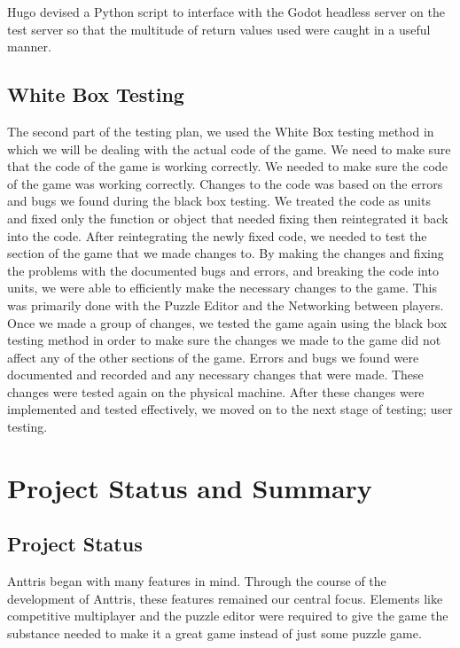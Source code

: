 \documentclass[12pt]{article}
\begin{document}
Hugo devised a Python script to interface with the Godot headless server on the test server so that the multitude of return values used were caught in a useful manner. 

\subsection{White Box Testing}
The second part of the testing plan, we used the White Box testing method in which we will be dealing with the actual code of the game. We need to make sure that the code of the game is working correctly. We needed to make sure the code of the game was working correctly.
Changes to the code was based on the errors and bugs we found during the black box testing. We treated the code as units and fixed only the function or object that needed fixing then reintegrated it back into the code. After reintegrating the newly fixed code, we needed to test the section of the game that we made changes to.
By making the changes and fixing the problems with the documented bugs and errors, and breaking the code into units, we were able to efficiently make the necessary changes to the game. This was primarily done with the Puzzle Editor and the Networking between players. Once we made a group of changes, we tested the game again using the black box testing method in order to make sure the changes we made to the game did not affect any of the other sections of the game. Errors and bugs we found were documented and recorded and any necessary changes that were made. These changes were tested again on the physical machine. After these changes were implemented and tested effectively, we moved on to the next stage of testing; user testing.


\section{Project Status and Summary}
\subsection{Project Status} %
Anttris began with many features in mind. Through the course of the development of Anttris, these features remained our central focus. Elements like competitive multiplayer and the puzzle editor were required to give the game the substance needed to make it a great game instead of just some puzzle game.
\end{document}
